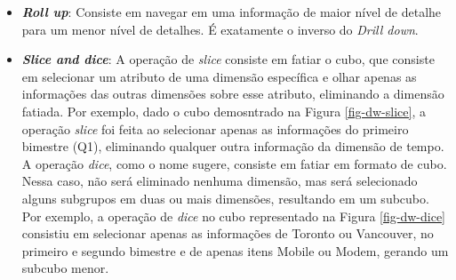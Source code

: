 \begin{itemize}
	\item \textbf{\emph{Roll up}}: Consiste em navegar em uma informação de maior nível de detalhe para um menor nível de detalhes. É exatamente o inverso do \emph{Drill down}.
 \end{itemize}


\begin{itemize}
	\item \textbf{\emph{Slice and dice}}: A operação de \emph{slice} consiste em fatiar o cubo, que consiste em selecionar um atributo de uma dimensão específica e olhar apenas as informações das outras dimensões sobre esse atributo, eliminando a dimensão fatiada. Por exemplo, dado o cubo demosntrado na Figura \ref{fig-dw-slice}, a operação \emph{slice} foi feita ao selecionar apenas as informações do primeiro bimestre (Q1), eliminando qualquer outra informação da dimensão de tempo. A operação \emph{dice}, como o nome sugere, consiste em fatiar em formato de cubo. Nessa caso, não será eliminado nenhuma dimensão, mas será selecionado alguns subgrupos em duas ou mais dimensões, resultando em um subcubo. Por exemplo,  a operação de \emph{dice} no cubo representado na Figura \ref{fig-dw-dice} consistiu em selecionar apenas as informações de Toronto ou Vancouver, no primeiro e segundo bimestre e de apenas itens Mobile ou Modem, gerando um subcubo menor.
\end{itemize}

